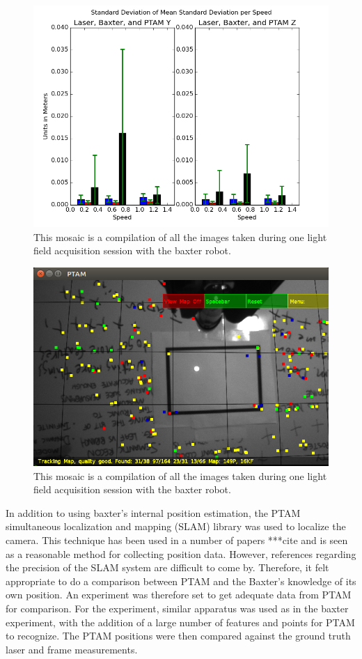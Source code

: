 \documentclass[12pt]{report}
\begin{document}
\begin{figure}[!ht]
	\centering
	\includegraphics[scale=0.55]{bax_and_ptam_std_dev.png}
	\caption{This mosaic is a compilation of all the images taken during one light field acquisition session with the baxter robot.}
	\label{fig:bax_ptam_std_dev}
\end{figure}

\begin{figure}[!ht]
	\centering
	\includegraphics[scale=0.55]{experiment_image.png}
	\caption{This mosaic is a compilation of all the images taken during one light field acquisition session with the baxter robot.}
	\label{fig:bax_ptam_std_dev}
\end{figure}

In addition to using baxter's internal position estimation, the PTAM simultaneous localization and mapping (SLAM) library was used to localize the camera. This technique has been used in a number of papers ***cite and is seen as a reasonable method for collecting position data. However, references regarding the precision of the SLAM system are difficult to come by. Therefore, it felt appropriate to do a comparison between PTAM and the Baxter's knowledge of its own position. An experiment was therefore set to get adequate data from PTAM for comparison. For the experiment, similar apparatus was used as in the baxter experiment, with the addition of a large number of features and points for PTAM to recognize. The PTAM positions were then compared against the ground truth laser and frame measurements. 
\end{document}

